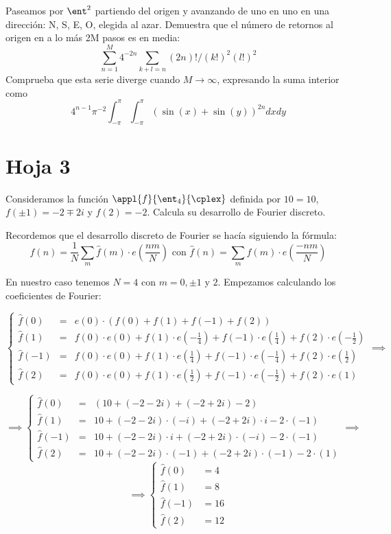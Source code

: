 \begin{problem}[15]
	Paseamos por $\ent^2$ partiendo del origen y avanzando de uno en uno en una dirección: N, S, E, O, elegida al azar. Demuestra que el número de retornos al origen en a lo más 2M pasos es en media:
	\[\sum_{n=1}^M 4^{-2n}\sum_{k+l=n}(2n)!/(k!)^2(l!)^2\]
	Comprueba que esta serie diverge cuando $M \to \infty$, expresando la suma interior como
	\[4^{n-1}π^{-2}\int_{-π}^π\int_{-π}^π\left(\sin(x)+\sin(y)\right)^{2n}dxdy\]
	\solution


\end{problem}

\section{Hoja 3}
\begin{problem}[1]
Consideramos la función $\appl{f}{\ent_4}{\cplex}$ definida por $10=10$, $f(\pm 1) = -2 \mp 2i$ y $f(2)=-2$. Calcula su desarrollo de Fourier discreto.

\solution

Recordemos que el desarrollo discreto de Fourier se hacía siguiendo la fórmula:
\[f(n)=\frac{1}{N}\sum_m \hat{f}(m)\cdot e \left(\frac{nm}{N} \right) \text{ con } \hat{f}(n)=\sum_m f(m) \cdot e\left(\frac{-nm}{N}\right)\]

En nuestro caso tenemos $N=4$ con $m=0, \pm 1$ y $ 2$. Empezamos calculando los coeficientes de Fourier:

\[\left\{
\begin{array}{rcl}
\hat{f}(0) & =  & e(0) \cdot \left( f(0)+f(1)+f(-1)+f(2) \right)\\
\hat{f}(1) & =  & f(0) \cdot e(0)+f(1) \cdot e \left(-\frac{1}{4}\right) + f(-1)\cdot e \left(\frac{1}{4}\right)+f(2) \cdot e \left(-\frac{1}{2}\right)\\
\hat{f}(-1) & =  &  f(0) \cdot e(0)+f(1) \cdot e \left(\frac{1}{4}\right) + f(-1)\cdot e \left(-\frac{1}{4}\right)+f(2) \cdot e \left(\frac{1}{2}\right)\\
\hat{f}(2) & =  &  f(0) \cdot e(0)+f(1) \cdot e \left(\frac{1}{2}\right) + f(-1)\cdot e \left(-\frac{1}{2}\right)+f(2) \cdot e \left(1\right)
\end{array} \right. \implies \]

\[\implies \left\{
\begin{array}{rcl}
\hat{f}(0) & =  & \left( 10+(-2-2i)+(-2+2i)-2 \right)\\
\hat{f}(1) & =  & 10 +(-2-2i) \cdot (-i) + (-2+2i)\cdot i-2 \cdot (-1)\\
\hat{f}(-1) & =  &  10 +(-2-2i) \cdot i + (-2+2i)\cdot (-i)-2 \cdot (-1)\\
\hat{f}(2) & =  &  10 +(-2-2i) \cdot (-1) + (-2+2i)\cdot (-1)-2 \cdot (1)
\end{array} \right. \implies
\]
\[\implies \left\{
\begin{array}{rcl}
\hat{f}(0) & = 4 \\
\hat{f}(1) & = 8 \\
\hat{f}(-1) & = 16 \\
\hat{f}(2) & = 12
\end{array} \right. \]


\end{problem}
